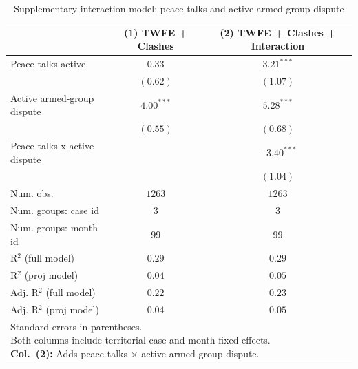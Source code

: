 
\begin{table}
\caption{Supplementary interaction model: peace talks and active armed-group dispute}
\begin{center}
\begin{tabular}{l c c}
\toprule
 & (1) TWFE + Clashes & (2) TWFE + Clashes + Interaction \\
\midrule
Peace talks active           & $0.33$       & $3.21^{***}$  \\
                             & $(0.62)$     & $(1.07)$      \\
Active armed-group dispute   & $4.00^{***}$ & $5.28^{***}$  \\
                             & $(0.55)$     & $(0.68)$      \\
Peace talks x active dispute &              & $-3.40^{***}$ \\
                             &              & $(1.04)$      \\
\midrule
Num. obs.                    & $1263$       & $1263$        \\
Num. groups: case id        & $3$          & $3$           \\
Num. groups: month id       & $99$         & $99$          \\
R$^2$ (full model)           & $0.29$       & $0.29$        \\
R$^2$ (proj model)           & $0.04$       & $0.05$        \\
Adj. R$^2$ (full model)      & $0.22$       & $0.23$        \\
Adj. R$^2$ (proj model)      & $0.04$       & $0.05$        \\
\bottomrule
\multicolumn{3}{l}{\scriptsize{\parbox{\linewidth}{Standard errors in parentheses.\\[0.35em] Both columns include territorial-case and month fixed effects.\\[0.35em] \textbf{Col.~(2):} Adds peace talks $\times$ active armed-group dispute.}}}
\end{tabular}
\label{tab:twfe_interaction}
\end{center}
\end{table}
